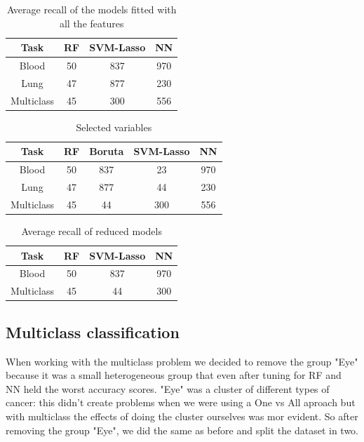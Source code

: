 \documentclass[a4paper,11pt, oneside]{article}  %
\begin{document}
\begin{table}[ht]
\caption{Average recall of the models fitted with all the features}
\centering
\begin{tabular}{c c c c}
\hline\hline
Task & RF & SVM-Lasso & NN \\ [0.5ex] %
\hline
Blood & 50 & 837 & 970 \\
Lung &47 & 877 & 230 \\
Multiclass & 45 & 300 & 556 \\ [1ex]
\hline
\end{tabular}
\label{table:big_models}
\end{table}

\begin{table}[ht]
\caption{Selected variables}
\centering
\begin{tabular}{c c c c c}
\hline\hline
Task & RF & Boruta & SVM-Lasso & NN \\ [0.5ex] %
\hline
Blood & 50 &837 & 23 & 970 \\
Lung &47 & 877 & 44 & 230 \\
Multiclass & 45 &  44 & 300 & 556 \\ [1ex]
\hline
\end{tabular}
\label{table:selected variables}
\end{table}

\begin{table}[ht]
\caption{Average recall of reduced models}
\centering
\begin{tabular}{c c c c}
\hline\hline
Task & RF & SVM-Lasso & NN \\ [0.5ex] %
\hline
Blood & 50 &837 & 970 \\
Multiclass & 45 &  44 & 300 \\ [1ex]
\hline
\end{tabular}
\label{table:reduced_models}
\end{table}





\subsection{Multiclass classification}
When working with the multiclass problem we decided to remove the group "Eye" because it was a small heterogeneous group that even after tuning for RF and NN held the worst accuracy scores. "Eye" was a cluster of different types of cancer: this didn't create problems when we were using a One vs All aproach but with multiclass the effects of doing the cluster ourselves was mor evident.  
So after removing the group "Eye", we did the same as before and split the dataset in two.
\end{document}
